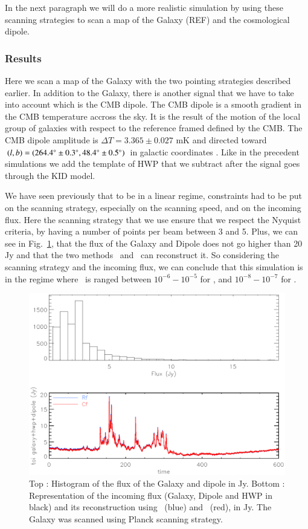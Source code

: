 In the next paragraph we will do a more realistic simulation by using these scanning strategies to scan a map of the Galaxy (REF) and the cosmological dipole.

\subsubsection{Results}

Here we scan a map of the Galaxy with the two pointing strategies described earlier. In addition to the Galaxy, there is another signal that we have to take into account which is the CMB dipole. The CMB dipole is a smooth gradient in the CMB temperature accross the sky. It is the result of the motion of the local group of galaxies with respect to the reference framed defined by the CMB. The CMB dipole amplitude is $\Delta T = 3.365 \pm 0.027$ mK and directed toward $(l,b) = (264.4 \degree \pm 0.3 \degree , 48.4 \degree \pm 0.5 \degree)$ in galactic coordinates \citep{2015IJMPD..2430004B}. Like in the precedent simulations we add the template of HWP that we subtract after the signal goes through the KID model.

We have seen previously that to be in a linear regime, constraints had to be put on the scanning strategy, especially on the scanning speed, and on the incoming flux. Here the scanning strategy that we use ensure that we respect the Nyquist criteria, by having a number of points per beam between 3 and 5. Plus, we can see in Fig.~\ref{fig:histo-gal-dip}, that the flux of the Galaxy and Dipole does not go higher than 20 Jy and that the two methods \rf\ and \cf\ can reconstruct it. So considering the scanning strategy and the incoming flux, we can conclude that this simulation is in the regime where \eps\ is ranged between $10^{-6} - 10^{-5}$ for \rf , and $10^{-8} - 10^{-7}$ for \cf . 

\begin{figure}[h]
  \includegraphics[clip,angle=0,width=\columnwidth]{Figures/histo_gal_dip_epic.eps}
  \caption{Top : Histogram of the flux of the Galaxy and dipole in Jy. Bottom : Representation of the incoming flux (Galaxy, Dipole and HWP in black) and its reconstruction using \rf\ (blue) and \cf\ (red), in Jy. The Galaxy was scanned using Planck scanning strategy.}
  \label{fig:histo-gal-dip}
\end{figure}

